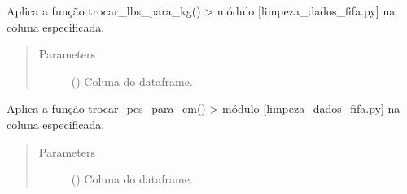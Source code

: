 \documentclass[letterpaper,10pt,brazil]{sphinxmanual}
\begin{document}
\begin{fulllineitems}
\begin{fulllineitems}
\begin{quote}
\begin{description}
\end{description}\end{quote}

\end{fulllineitems}


\begin{fulllineitems}
\label{\detokenize{classe_Fifa_limp:id6}}
Aplica a função trocar\_lbs\_para\_kg() \sphinxhyphen{}\textgreater{} módulo {[}limpeza\_dados\_fifa.py{]}\sphinxhyphen{} na coluna especificada.
\begin{quote}\begin{description}
\item[{Parameters}] \leavevmode
{} () \textendash{} Coluna do dataframe.

\end{description}\end{quote}

\end{fulllineitems}


\begin{fulllineitems}
\label{\detokenize{classe_Fifa_limp:id7}}
Aplica a função trocar\_pes\_para\_cm() \sphinxhyphen{}\textgreater{} módulo {[}limpeza\_dados\_fifa.py{]}\sphinxhyphen{} na coluna especificada.
\begin{quote}\begin{description}
\item[{Parameters}] \leavevmode
{} () \textendash{} Coluna do dataframe.

\end{description}\end{quote}

\end{fulllineitems}


\end{fulllineitems}
\end{document}
